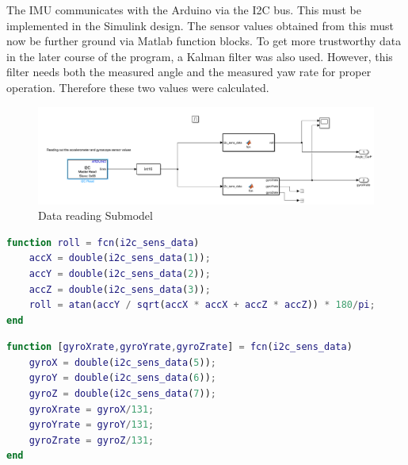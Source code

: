 The IMU communicates with the Arduino via the I2C bus. This must be implemented in the Simulink design. The sensor values obtained from this must now be further ground via Matlab function blocks. To get more trustworthy data in the later course of the program, a Kalman filter was also used. However, this filter needs both the measured angle and the measured yaw rate for proper operation. Therefore these two values were calculated. 

\begin{figure}[H]
    \centering
    \includegraphics[width=1.1\textwidth]{Lab_report/pics/hardware_impl/gyro_read.PNG}
    \caption{Data reading Submodel}
    \label{fig:acc_gyro_read}
\end{figure}

\begin{lstlisting}[language=Matlab, caption=angle calculation]
function roll = fcn(i2c_sens_data)
    accX = double(i2c_sens_data(1));
    accY = double(i2c_sens_data(2));
    accZ = double(i2c_sens_data(3));
    roll = atan(accY / sqrt(accX * accX + accZ * accZ)) * 180/pi; 
end
\end{lstlisting}

\begin{lstlisting}[language=Matlab, caption=gyro rate calculation]
function [gyroXrate,gyroYrate,gyroZrate] = fcn(i2c_sens_data)
    gyroX = double(i2c_sens_data(5));
    gyroY = double(i2c_sens_data(6));
    gyroZ = double(i2c_sens_data(7));
    gyroXrate = gyroX/131;
    gyroYrate = gyroY/131;
    gyroZrate = gyroZ/131; 
end
\end{lstlisting}